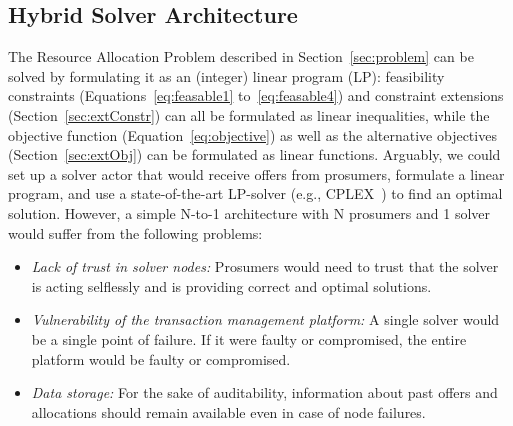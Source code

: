 \subsection{Hybrid Solver Architecture}
\label{sec:solver}
The Resource Allocation Problem described in Section~\ref{sec:problem} can be solved by formulating it as an (integer) linear program (LP): feasibility constraints (Equations~\eqref{eq:feasable1} to~\eqref{eq:feasable4}) and constraint extensions (Section~\ref{sec:extConstr}) can all be formulated as linear inequalities, while the objective function (Equation~\eqref{eq:objective}) as well as the alternative objectives (Section~\ref{sec:extObj}) can be formulated as linear functions. Arguably, we could set up a solver actor that would receive offers from  prosumers, formulate a linear program, and use a state-of-the-art LP-solver (e.g., CPLEX~\cite{cplex2009v12}) to find an optimal solution. However, a simple N-to-1 architecture with N prosumers and 1 solver would suffer from the following problems: 
\begin{itemize}
    \item {\it Lack of trust in solver nodes:} Prosumers would need to trust that the solver is acting selflessly and is providing correct and optimal solutions. 
    \item {\it Vulnerability of the transaction management platform:} A single solver would be a single point of failure. If it were faulty or compromised, the entire platform would be faulty or compromised.  %
    \item {\it Data storage:} For the sake of auditability, information about past offers and allocations should remain available even in case of node failures. 
\end{itemize}




